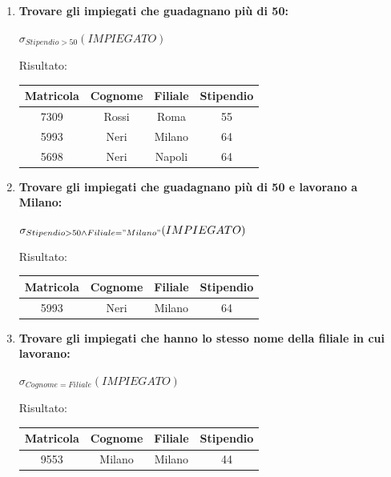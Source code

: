 \documentclass{article}
\begin{document}
\begin{enumerate}
    \item \textbf{Trovare gli impiegati che guadagnano più di 50:}

    $\sigma_{Stipendio > 50} (IMPIEGATO)$

    Risultato:
    \begin{tabular}{|c|c|c|c|}
            \hline
            \textbf{Matricola} & \textbf{Cognome} & \textbf{Filiale} & \textbf{Stipendio} \\
            \hline
            7309 & Rossi & Roma & 55 \\
            \hline
            5993 & Neri & Milano & 64 \\
            \hline
            5698 & Neri & Napoli & 64 \\
            \hline
        \end{tabular}
    
    \item \textbf{Trovare gli impiegati che guadagnano più di 50 e lavorano a Milano:}

        $\sigma_{Stipendio > 50 \land Filiale = "Milano"} (IMPIEGATO)$
         
         Risultato:
    \begin{tabular}{|c|c|c|c|}
            \hline
            \textbf{Matricola} & \textbf{Cognome} & \textbf{Filiale} & \textbf{Stipendio} \\
            \hline
            5993 & Neri & Milano & 64 \\
        
            \hline
        \end{tabular}
    \item \textbf{Trovare gli impiegati che hanno lo stesso nome della filiale in cui lavorano:}

            $\sigma_{Cognome = Filiale} (IMPIEGATO)$

Risultato:
         \begin{tabular}{|c|c|c|c|}
        \hline
        \textbf{Matricola} & \textbf{Cognome} & \textbf{Filiale} & \textbf{Stipendio} \\
        \hline
 
        9553 & Milano & Milano & 44 \\
        
        \hline
    \end{tabular}
\end{enumerate}

\newpage
\end{document}
